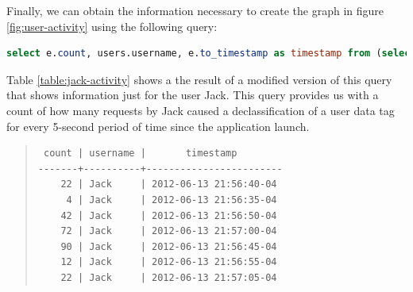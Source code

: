Finally, we can obtain the information necessary to create the graph in figure \ref{fig:user-activity} using the following query:

\begin{lstlisting}[language=SQL, deletendkeywords={TIMESTAMP}, label=code:query-accesses]
select e.count, users.username, e.to_timestamp as timestamp from (select count(*), tags_modified, (to_timestamp(((extract (epoch from events.timestamp)/5)::int)*5)) from events tags_modified in (select tag from users) group by (to_timestamp(((extract (epoch from events.timestamp)/5)::int)*5)), tags_modified) as e inner join users on e.tags_modified=users.tag
\end{lstlisting}

Table \ref{table:jack-activity} shows a the result of a modified version of this query that shows information just for the user Jack. This query provides us with a count of how many requests by Jack caused a declassification of a user data tag for every 5-second period of time since the application launch.

\begin{table}
\begin{quote}
\begin{verbatim}
 count | username |       timestamp        
-------+----------+------------------------
    22 | Jack     | 2012-06-13 21:56:40-04
     4 | Jack     | 2012-06-13 21:56:35-04
    42 | Jack     | 2012-06-13 21:56:50-04
    72 | Jack     | 2012-06-13 21:57:00-04
    90 | Jack     | 2012-06-13 21:56:45-04
    12 | Jack     | 2012-06-13 21:56:55-04
    22 | Jack     | 2012-06-13 21:57:05-04
\end{verbatim}
\end{quote}
\caption*{Account activity for user Jack}
\caption[Mint Account activity for user Jack]{This table shows the number of declassifies done by Jack's principal in each five-second period since the application launched. The \emph{count} denotes such number. The \emph{username} column denotes the user who's data tag is in question. The \emph{timestamp} column denotes the start of the 5-second period. A table containing similar information for all users would be a precursor to producing the graph in figure \ref{fig:user-activity}, here we only show this data for user Jack for simplicity.}
\label{table:jack-activity}
\end{table}
